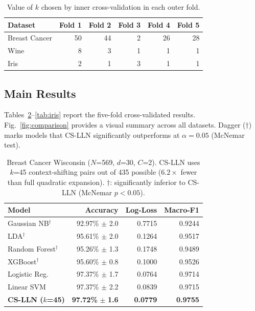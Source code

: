 \documentclass[conference]{IEEEtran}
\begin{document}
\begin{table}[!t]
\caption{Value of $k$ chosen by inner cross-validation in each outer fold.}
\label{tab:kselect}
\begin{center}
\begin{tabular}{lrrrrr}
\toprule
\textbf{Dataset} & \textbf{Fold 1} & \textbf{Fold 2} & \textbf{Fold 3}
                 & \textbf{Fold 4} & \textbf{Fold 5} \\
\midrule
Breast Cancer & 50 & 44 & 2 & 26 & 28 \\
Wine          &  8 &  3 & 1 &  1 &  1 \\
Iris          &  2 &  1 & 3 &  1 &  1 \\
\bottomrule
\end{tabular}
\end{center}
\end{table}

\subsection{Main Results}
\label{sec:results}

Tables~\ref{tab:bc}--\ref{tab:iris} report the five-fold cross-validated
results.
Fig.~\ref{fig:comparison} provides a visual summary across all datasets.
Dagger ($\dagger$) marks models that CS-LLN significantly outperforms
at $\alpha = 0.05$ (McNemar test).

\begin{table}[!t]
\caption{Breast Cancer Wisconsin ($N$=569, $d$=30, $C$=2).
CS-LLN uses $k$=45 context-shifting pairs out of 435 possible ($6.2\times$
fewer than full quadratic expansion).
$\dagger$: significantly inferior to CS-LLN (McNemar $p < 0.05$).}
\label{tab:bc}
\begin{center}
\begin{tabular}{lrrr}
\toprule
\textbf{Model}
  & \textbf{Accuracy}
  & \textbf{Log-Loss}
  & \textbf{Macro-F1} \\
\midrule
Gaussian NB$^\dagger$
  & 92.97\% \(\pm\) 2.0
  & 0.7715
  & 0.9244 \\
LDA$^\dagger$
  & 95.61\% \(\pm\) 2.0
  & 0.1264
  & 0.9517 \\
Random Forest$^\dagger$
  & 95.26\% \(\pm\) 1.3
  & 0.1748
  & 0.9489 \\
XGBoost$^\dagger$
  & 95.60\% \(\pm\) 0.8
  & 0.1000
  & 0.9526 \\
Logistic Reg.
  & 97.37\% \(\pm\) 1.7
  & 0.0764
  & 0.9714 \\
Linear SVM
  & 97.37\% \(\pm\) 2.2
  & 0.0839
  & 0.9715 \\
\textbf{CS-LLN ($k$=45)}
  & \textbf{97.72\%} \(\pm\) \textbf{1.6}
  & \textbf{0.0779}
  & \textbf{0.9755} \\
\bottomrule
\end{tabular}
\end{center}
\end{table}
\end{document}
